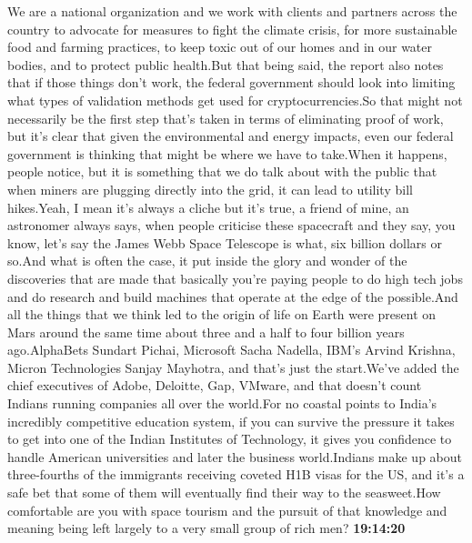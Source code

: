 \documentclass{article}%
\begin{document}
We are a national organization and we work with clients and partners across the country to advocate for measures to fight the climate crisis, for more sustainable food and farming practices, to keep toxic out of our homes and in our water bodies, and to protect public health.But that being said, the report also notes that if those things don't work, the federal government should look into limiting what types of validation methods get used for cryptocurrencies.So that might not necessarily be the first step that's taken in terms of eliminating proof of work, but it's clear that given the environmental and energy impacts, even our federal government is thinking that might be where we have to take.When it happens, people notice, but it is something that we do talk about with the public that when miners are plugging directly into the grid, it can lead to utility bill hikes.Yeah, I mean it's always a cliche but it's true, a friend of mine, an astronomer always says, when people criticise these spacecraft and they say, you know, let's say the James Webb Space Telescope is what, six billion dollars or so.And what is often the case, it put inside the glory and wonder of the discoveries that are made that basically you're paying people to do high tech jobs and do research and build machines that operate at the edge of the possible.And all the things that we think led to the origin of life on Earth were present on Mars around the same time about three and a half to four billion years ago.AlphaBets Sundart Pichai, Microsoft Sacha Nadella, IBM's Arvind Krishna, Micron Technologies Sanjay Mayhotra, and that's just the start.We've added the chief executives of Adobe, Deloitte, Gap, VMware, and that doesn't count Indians running companies all over the world.For no coastal points to India's incredibly competitive education system, if you can survive the pressure it takes to get into one of the Indian Institutes of Technology, it gives you confidence to handle American universities and later the business world.Indians make up about three{-}fourths of the immigrants receiving coveted H1B visas for the US, and it's a safe bet that some of them will eventually find their way to the seasweet.How comfortable are you with space tourism and the pursuit of that knowledge and meaning being left largely to a very small group of rich men?%
\textbf{19:14:20}%
\newline%
\end{document}
